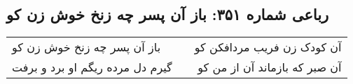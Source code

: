 \begin{center}
\section*{رباعی شماره ۳۵۱: باز آن پسر چه زنخ خوش زن کو}
\label{sec:sh351}
\begin{longtable}{l p{0.5cm} r}
باز آن پسر چه زنخ خوش زن کو
&&
آن کودک زن فریب مردافکن کو
\\
گیرم دل مرده ریگم او برد و برفت
&&
آن صبر که بازماند آن از من کو
\\
\end{longtable}
\end{center}
